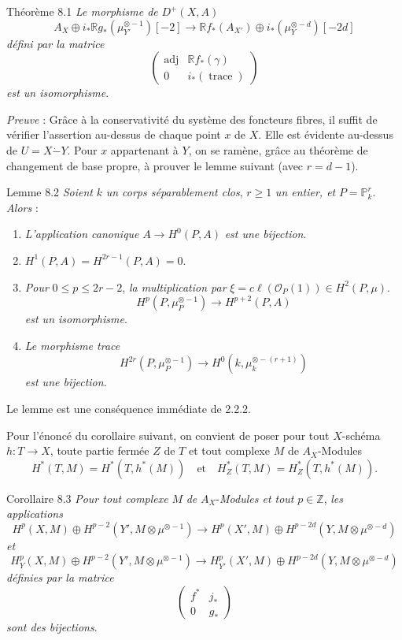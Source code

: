 \begin{statement}{Théorème 8.1}
\emph{Le morphisme de} $D^+(X,A)$
\[
A_X\oplus i_*\mathbb{R} g_*(\mu_{Y'}^{\otimes -1})[-2]\to
\mathbb{R} f_*(A_{X'})\oplus i_*(\mu_Y^{\otimes -d})[-2d]
\tag{8.1.1}
\]
\emph{défini par la matrice}
\[
\begin{pmatrix}
\operatorname{adj}&\mathbb{R} f_*(\gamma)\\
0&i_*(\operatorname{trace})
\end{pmatrix}
\]
\emph{est un isomorphisme}.
\end{statement}

\emph{Preuve} : Grâce à la conservativité du système des foncteurs fibres, il suffit de vérifier l'assertion au-dessus de chaque point $x$ de $X$. Elle est évidente au-dessus de $U=X\mathbin{\dot{-}}Y$. Pour $x$ appartenant à $Y$, on se ramène, grâce au théorème de changement de base propre, à prouver le lemme suivant (avec $r=d-1$).

\begin{statement}{Lemme 8.2}
\emph{Soient} $k$ \emph{un corps séparablement clos}, $r\ge1$ \emph{un entier, et} $P=\mathbb{P}_k^r$. \emph{Alors} :
\begin{enumerate}[label=\alph*)]
\item \emph{L'application canonique} $A\to H^0(P,A)$ \emph{est une bijection}.
\item $H^1(P,A)=H^{2r-1}(P,A)=0$.
\item
\emph{Pour} $0\le p\le2r-2$, \emph{la multiplication par} $\xi=c\ell(\mathcal{O}_P(1))\in H^2(P,\mu)$.
\[
H^p(P,\mu_P^{\otimes -1})\to H^{p+2}(P,A)
\]
\emph{est un isomorphisme}.
\item \emph{Le morphisme trace}
\[
H^{2r}(P,\mu_P^{\otimes -1})\to H^0(k,\mu_k^{\otimes -(r+1)})
\]
\emph{est une bijection}.
\end{enumerate}
\end{statement}

Le lemme est une conséquence immédiate de 2.2.2.

Pour l'énoncé du corollaire suivant, on convient de poser pour tout $X$-schéma $h:T\to X$, toute partie fermée $Z$ de $T$ et tout complexe $M$ de $A_X$-Modules
\[
H^*(T,M)=H^*(T,h^*(M))
\quad\text{et}\quad
H^*_Z(T,M)=H^*_Z(T,h^*(M)).
\]

\begin{statement}{Corollaire 8.3}
\emph{Pour tout complexe} $M$ \emph{de} $A_X$-\emph{Modules et tout} $p\in\mathbb{Z}$, \emph{les applications}
\[
H^p(X,M)\oplus H^{p-2}(Y',M\otimes\mu^{\otimes -1})
\to
H^p(X',M)\oplus H^{p-2d}(Y,M\otimes\mu^{\otimes -d})
\tag{8.3.1.}
\]
\emph{et}
\[
H_Y^p(X,M)\oplus H^{p-2}(Y',M\otimes\mu^{\otimes -1})
\to
H_{Y'}^p(X',M)\oplus H^{p-2d}(Y,M\otimes\mu^{\otimes -d})
\tag{8.3.2}
\]
\emph{définies par la matrice}
\[
\begin{pmatrix}
f^*&j_*\\
0&g_*
\end{pmatrix}
\]
\emph{sont des bijections}.
\end{statement}

